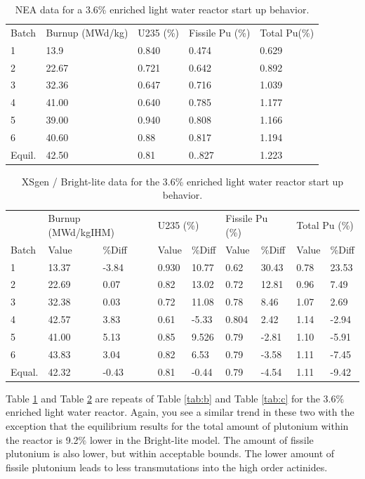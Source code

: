 \documentclass{article}
\begin{document}
\begin{table}[!htb]
\centering
\caption{NEA data for a 3.6\% enriched light water reactor start up behavior.}
\label{tab:d}
\begin{tabular}{lllll}
Batch & Burnup (MWd/kg) & U235 (\%) & Fissile Pu (\%) & Total Pu(\%) \\
1 & 13.9 & 0.840 & 0.474 & 0.629 \\
2 & 22.67 & 0.721 & 0.642 & 0.892 \\
3 & 32.36 & 0.647 & 0.716 & 1.039 \\
4 & 41.00 & 0.640 & 0.785 & 1.177 \\
5 & 39.00 & 0.940 & 0.808 & 1.166 \\
6 & 40.60 & 0.88 & 0.817 & 1.194 \\
Equil. & 42.50 & 0.81 & 0..827 & 1.223
\end{tabular}
\end{table}

\begin{table}[!htb]
\centering
\caption{XSgen / Bright-lite data for the 3.6\% enriched light water reactor start up behavior.}
\label{tab:e}
\begin{tabular}{lllllllll}
 & \multicolumn{2}{l}{Burnup (MWd/kgIHM)} & \multicolumn{2}{l}{U235 (\%)} & \multicolumn{2}{l}{Fissile Pu (\%)} & \multicolumn{2}{l}{Total Pu (\%)} \\
Batch & Value & \%Diff & Value & \%Diff & Value & \%Diff & Value & \%Diff \\
1 & 13.37 & -3.84 & 0.930 & 10.77 & 0.62 & 30.43 & 0.78 & 23.53 \\
2 & 22.69 & 0.07 & 0.82 & 13.02 & 0.72 & 12.81 & 0.96 & 7.49 \\
3 & 32.38 & 0.03 & 0.72 & 11.08 & 0.78 & 8.46 & 1.07 & 2.69 \\
4 & 42.57 & 3.83 & 0.61 & -5.33 & 0.804 & 2.42 & 1.14 & -2.94 \\
5 & 41.00 & 5.13 & 0.85 & 9.526 & 0.79 & -2.81 & 1.10 & -5.91 \\
6 & 43.83 & 3.04 & 0.82 & 6.53 & 0.79 & -3.58 & 1.11 & -7.45 \\
Equal. & 42.32 & -0.43 & 0.81 & -0.44 & 0.79 & -4.54 & 1.11 & -9.42
\end{tabular}
\end{table}

Table \ref{tab:d} and Table \ref{tab:e} are repeats of Table \ref{tab:b} and Table \ref{tab:c} for the 3.6$\%$ enriched light water reactor. Again, you see a similar trend in these two with the exception that the equilibrium results for the total amount of plutonium within the reactor is 9.2$\%$ lower in the Bright-lite model. The amount of fissile plutonium is also lower, but within acceptable bounds. The lower amount of fissile plutonium leads to less transmutations into the high order actinides.
\end{document}
